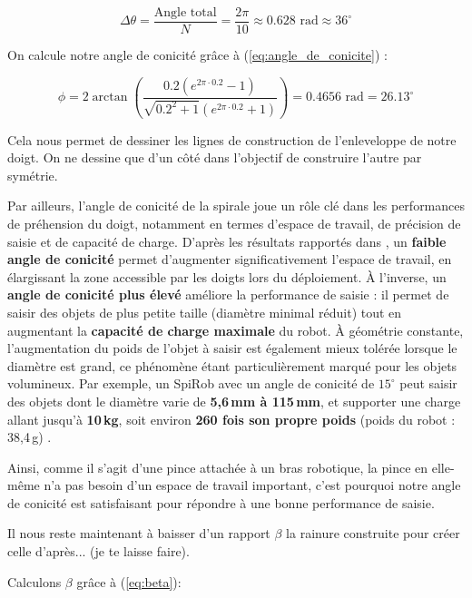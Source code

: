\documentclass[a4paper, 11pt]{report}
\begin{document}
            \[
            \Delta\theta= \frac{\text{Angle total}}{N} = \frac{2\pi}{10} \approx 0.628 \text{ rad} \approx 36^{\circ}
            \]
            
            On calcule notre angle de conicité grâce à (\ref{eq:angle_de_conicite}) :
            
            \[
            \phi = 2 \arctan\left( \frac{0.2\left(e^{2\pi \cdot 0.2} - 1\right)}{\sqrt{0.2^2 + 1} \left(e^{2\pi \cdot 0.2} + 1\right)} \right)
            = 0.4656 \text{ rad}
            = 26.13^{\circ}
            \]

            Cela nous permet de dessiner les lignes de construction de l'enleveloppe de notre doigt. On ne dessine que d'un côté dans l'objectif de construire l'autre par symétrie.

            Par ailleurs, l'angle de conicité de la spirale joue un rôle clé dans les performances de préhension du doigt, notamment en termes d’espace de travail, de précision de saisie et de capacité de charge. 
            D’après les résultats rapportés dans \cite{wang_spirobs_2025}, un \textbf{faible angle de conicité} permet d’augmenter significativement l’espace de travail, en élargissant la zone accessible par les doigts lors du déploiement. À l’inverse, un \textbf{angle de conicité plus élevé} améliore la performance de saisie : il permet de saisir des objets de plus petite taille (diamètre minimal réduit) tout en augmentant la \textbf{capacité de charge maximale} du robot.
            À géométrie constante, l’augmentation du poids de l’objet à saisir est également mieux tolérée lorsque le diamètre est grand, ce phénomène étant particulièrement marqué pour les objets volumineux. Par exemple, un SpiRob avec un angle de conicité de $15^\circ$ peut saisir des objets dont le diamètre varie de \textbf{5{,}6\,mm à 115\,mm}, et supporter une charge allant jusqu’à \textbf{10\,kg}, soit environ \textbf{260 fois son propre poids} (poids du robot : 38{,}4\,g) \cite{wang_spirobs_2025}.

            Ainsi, comme il s'agit d'une pince attachée à un bras robotique, la pince en elle-même n'a pas besoin d'un espace de travail important, c'est pourquoi notre angle de conicité est satisfaisant pour répondre à une bonne performance de saisie.

            Il nous reste maintenant à baisser d'un rapport $\beta$ la rainure construite pour créer celle d'après... (je te laisse faire).
            
            Calculons $\beta$ grâce à (\ref{eq:beta}):
\end{document}
